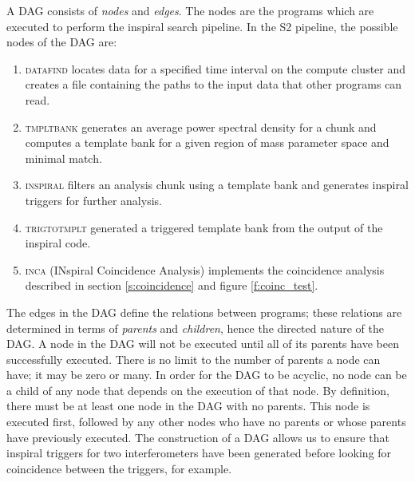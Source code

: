 A DAG consists of \emph{nodes} and \emph{edges}. The nodes are the programs
which are executed to perform the inspiral search pipeline. In the S2
pipeline, the possible nodes of the DAG are:
\begin{enumerate}
\item\textsc{datafind} locates data for a specified time interval on the
compute cluster and creates a file containing the paths to the input data that
other programs can read.

\item\textsc{tmpltbank} generates an average power spectral density for a
chunk and computes a template bank for a given region of mass parameter space
and minimal match.

\item\textsc{inspiral} filters an analysis chunk using a template bank and
generates inspiral triggers for further analysis.

\item\textsc{trigtotmplt} generated a triggered template bank from the
output of the inspiral code.

\item\textsc{inca} (INspiral Coincidence Analysis) implements the
coincidence analysis described in section \ref{s:coincidence} and figure
\ref{f:coinc_test}.
\end{enumerate}
The edges in the DAG define the relations between programs; these relations
are determined in terms of \emph{parents} and \emph{children}, hence the
directed nature of the DAG. A node in the DAG will not be executed until all
of its parents have been successfully executed. There is no limit to the
number of parents a node can have; it may be zero or many. In order for the
DAG to be acyclic, no node can be a child of any node that depends on the
execution of that node. By definition, there must be at least one node in the
DAG with no parents. This node is executed first, followed by any other nodes
who have no parents or whose parents have previously executed.  The
construction of a DAG allows us to ensure that inspiral triggers for two
interferometers have been generated before looking for coincidence between the
triggers, for example.

